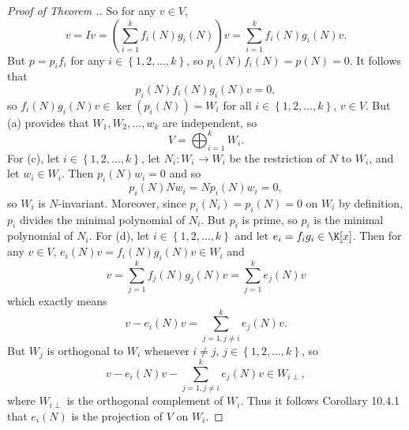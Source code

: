 \documentclass[linearalgebra]{subfiles}
\begin{document}
\begin{proof}[Proof of Theorem \thechapter.\thestcounter]
        So for any $v\in V$,
        \begin{equation*}
            v = Iv = \left( \sum^{k}_{i=1} f_i(N)g_i(N) \right) v = \sum^{k}_{i=1} f_i(N)g_i(N)v.
        \end{equation*}
        But $p = p_if_i$ for any $i\in\left\lbrace 1,2,\ldots,k \right\rbrace$, so $p_i(N)f_i(N) = p(N) = 0$. It follows that
        \begin{equation*}
            p_i(N)f_i(N)g_i(N)v = 0,
        \end{equation*}
        so $f_i(N)g_i(N)v\in\ker\left( p_i(N) \right) = W_i$ for all $i\in\left\lbrace 1,2,\ldots,k \right\rbrace$, $v\in V$. But (a) provides that $W_1,W_2,\ldots,w_k$ are independent, so
        \begin{equation*}
            V = \bigoplus^{k}_{i=1} W_i.
        \end{equation*}
        For (c), let $i\in\left\lbrace 1,2,\ldots,k \right\rbrace$, let $N_i:W_i\to W_i$ be the restriction of $N$ to $W_i$, and let $w_i\in W_i$. Then $p_i(N)w_i = 0$ and so
        \begin{equation*}
            p_i(N)Nw_i = Np_i(N)w_i = 0,
        \end{equation*}
        so $W_i$ is $N$-invariant. Moreover, since $p_i\left( N_i \right) = p_i(N) = 0$ on $W_i$ by definition, $p_i$ divides the minimal polynomial of $N_i$. But $p_i$ is prime, so $p_i$ is the minimal polynomial of $N_i$. For (d), let $i\in\left\lbrace 1,2,\ldots,k \right\rbrace$ and let $e_i=f_ig_i\in\K[x]$. Then for any $v\in V$, $e_i(N)v = f_i(N)g_i(N)v \in W_i$ and
        \begin{equation*}
            v = \sum^{k}_{j=1} f_j(N)g_j(N) v = \sum^{k}_{j=1} e_j(N)v
        \end{equation*}
        which exactly means
        \begin{equation*}
            v - e_i(N)v = \sum^{k}_{j=1,j\neq i} e_j(N)v.
        \end{equation*}
        But $W_j$ is orthogonal to $W_i$ whenever $i\neq j$, $j\in\left\lbrace 1,2,\ldots,k \right\rbrace$, so
        \begin{equation*}
            v-e_i(N)v - \sum^{k}_{j=1,j\neq i} e_j(N)v\in W_{i\perp},
        \end{equation*}
        where $W_{i\perp}$ is the orthogonal complement of $W_i$. Thus it follows Corollary 10.4.1 that $e_i(N)$ is the projection of $V$ on $W_i$.
    \end{proof}
\end{document}
